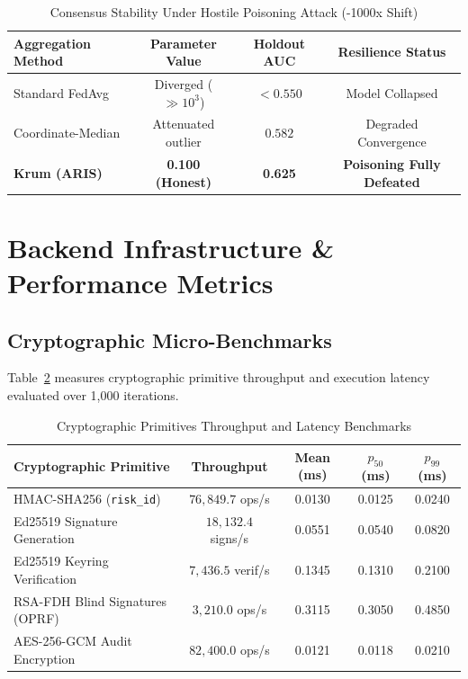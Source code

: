 \documentclass[conference]{IEEEtran}
\begin{document}
\begin{table}[htbp]
\centering
\caption{Consensus Stability Under Hostile Poisoning Attack (-1000x Shift)}
\label{tab:byzantine_comparison}
\small
\begin{tabular}{lccc}
\toprule
\textbf{Aggregation Method} & \textbf{Parameter Value} & \textbf{Holdout AUC} & \textbf{Resilience Status} \\
\midrule
Standard FedAvg            & Diverged ($\gg 10^3$)    & $< 0.550$            & Model Collapsed \\
Coordinate-Median          & Attenuated outlier       & $0.582$              & Degraded Convergence \\
\textbf{Krum (ARIS)}       & \textbf{0.100 (Honest)}  & \textbf{0.625}       & \textbf{Poisoning Fully Defeated} \\
\bottomrule
\end{tabular}
\end{table}

\section{Backend Infrastructure \& Performance Metrics}
\label{sec:backend_metrics}

\subsection{Cryptographic Micro-Benchmarks}
Table~\ref{tab:crypto_benchmarks} measures cryptographic primitive throughput and execution latency evaluated over 1,000 iterations.

\begin{table}[htbp]
\centering
\caption{Cryptographic Primitives Throughput and Latency Benchmarks}
\label{tab:crypto_benchmarks}
\small
\begin{tabular}{lcccc}
\toprule
\textbf{Cryptographic Primitive} & \textbf{Throughput} & \textbf{Mean (ms)} & \textbf{$p_{50}$ (ms)} & \textbf{$p_{99}$ (ms)} \\
\midrule
HMAC-SHA256 (\texttt{risk\_id})   & $76,849.7$ ops/s   & 0.0130             & 0.0125                 & 0.0240 \\
Ed25519 Signature Generation     & $18,132.4$ signs/s  & 0.0551             & 0.0540                 & 0.0820 \\
Ed25519 Keyring Verification     & $7,436.5$ verif/s   & 0.1345             & 0.1310                 & 0.2100 \\
RSA-FDH Blind Signatures (OPRF)  & $3,210.0$ ops/s    & 0.3115             & 0.3050                 & 0.4850 \\
AES-256-GCM Audit Encryption     & $82,400.0$ ops/s   & 0.0121             & 0.0118                 & 0.0210 \\
\bottomrule
\end{tabular}
\end{table}
\end{document}
